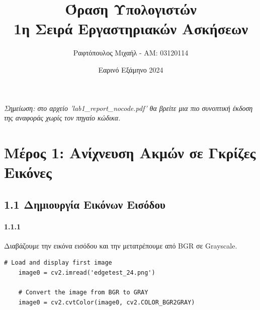 \documentclass[]{article}
\title{\textbf{Όραση Υπολογιστών}\\ 1η Σειρά Εργαστηριακών Ασκήσεων}
\author{Ραφτόπουλος Μιχαήλ - ΑΜ: 03120114}
\date{Εαρινό Εξάμηνο 2024}
\begin{document}
	\setmainfont{Liberation Serif}
	\maketitle
	
	\textit{Σημείωση: στο αρχείο 'lab1\_report\_nocode.pdf' θα βρείτε μια πιο συνοπτική έκδοση της αναφοράς χωρίς τον πηγαίο κώδικα.}
	\section*{Μέρος 1: Ανίχνευση Ακμών σε Γκρίζες Εικόνες}
	\subsection*{1.1 Δημιουργία Εικόνων Εισόδου}
	\paragraph{1.1.1} Διαβάζουμε την εικόνα εισόδου και την μετατρέπουμε από BGR  σε Grayscale.
	\begin{lstlisting}[caption={Import image and convert from BGR to GRAY}]
	# Load and display first image
	image0 = cv2.imread('edgetest_24.png')
	
	# Convert the image from BGR to GRAY
	image0 = cv2.cvtColor(image0, cv2.COLOR_BGR2GRAY)
	\end{lstlisting}
\end{document}
